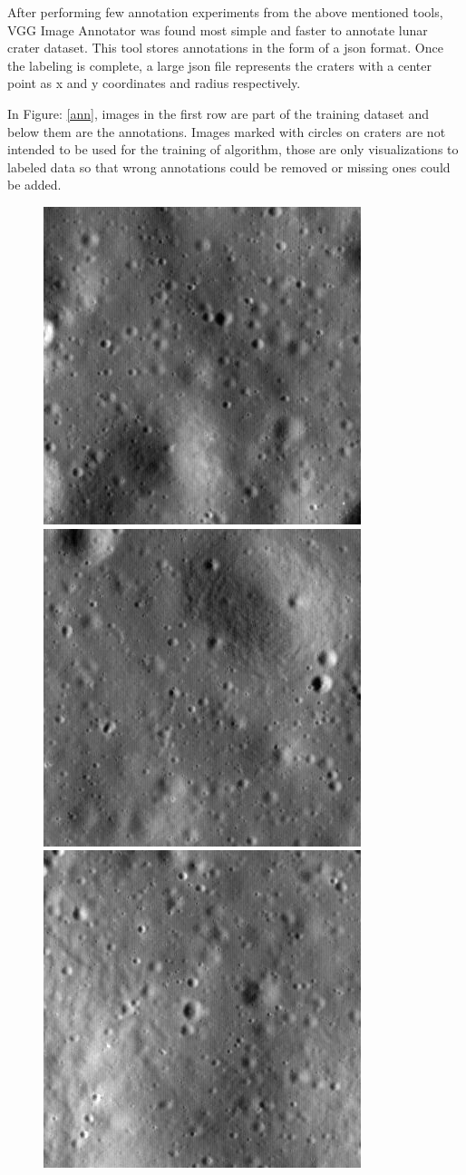 \documentclass[11pt]{article}
\begin{document}
After performing few annotation experiments from the above mentioned tools, VGG Image Annotator was found most simple and faster to annotate lunar crater dataset. This tool stores annotations in the form of a json format. Once the labeling is complete, a large json file represents the craters with a center point as x and y coordinates and radius respectively.

In Figure: \ref{ann}, images in the first row are part of the training dataset and below them are the annotations. Images marked with circles on craters are not intended to be used for the training of algorithm, those are only visualizations to labeled data so that wrong annotations could be removed or missing ones could be added.

\begin{figure}[ht!]
	\includegraphics[width=.3\textwidth]{files/annotation/66.png}\hfill
	\includegraphics[width=.3\textwidth]{files/annotation/29.png}\hfill
	\includegraphics[width=.3\textwidth]{files/annotation/20.png}
\end{figure}
\end{document}
